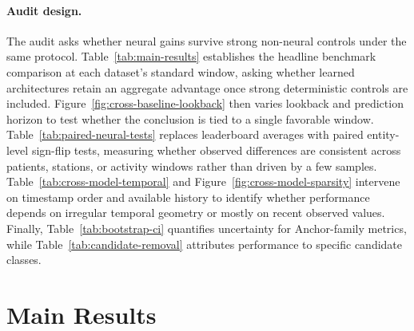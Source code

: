 \documentclass{article}
\begin{document}
\paragraph{Audit design.}
The audit asks whether neural gains survive strong non-neural controls under the
same protocol. Table~\ref{tab:main-results} establishes the headline
benchmark comparison at each dataset's standard window, asking whether learned
architectures retain an aggregate advantage once strong deterministic controls
are included. Figure~\ref{fig:cross-baseline-lookback} then varies lookback and
prediction horizon to test whether the conclusion is tied to a single favorable
window. Table~\ref{tab:paired-neural-tests} replaces leaderboard averages with
paired entity-level sign-flip tests, measuring whether observed differences are
consistent across patients, stations, or activity windows rather than driven by
a few samples. Table~\ref{tab:cross-model-temporal}
and Figure~\ref{fig:cross-model-sparsity} intervene on timestamp order and available
history to identify whether performance depends on irregular temporal geometry
or mostly on recent observed values. Finally, Table~\ref{tab:bootstrap-ci}
quantifies uncertainty for Anchor-family metrics, while
Table~\ref{tab:candidate-removal} attributes performance to specific candidate
classes.

\section{Main Results}

\end{document}
